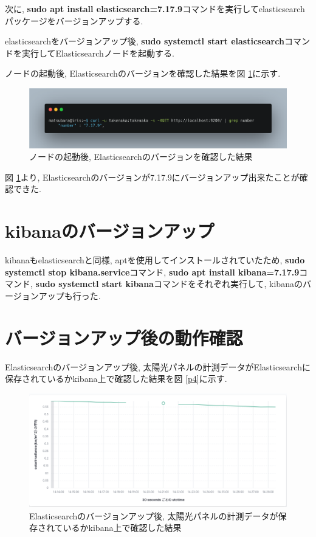 次に, \textbf{sudo apt install elasticsearch=7.17.9}コマンドを実行してelasticsearchパッケージをバージョンアップする.

elasticsearchをバージョンアップ後, \textbf{sudo systemctl start elasticsearch}コマンドを実行してElasticsearchノードを起動する.

ノードの起動後, Elasticsearchのバージョンを確認した結果を図 \ref{4-p3}に示す.

\begin{figure}[h]
  \begin{center}
    \includegraphics[width=160mm]{sotu/figure/version-check.png}
    \caption{ノードの起動後, Elasticsearchのバージョンを確認した結果}
    \label{4-p3}
  \end{center}
\end{figure}

図 \ref{4-p3}より, Elasticsearchのバージョンが7.17.9にバージョンアップ出来たことが確認できた.

\section{kibanaのバージョンアップ}

kibanaもelasticsearchと同様, aptを使用してインストールされていたため, \textbf{sudo systemctl stop kibana.service}コマンド, \textbf{sudo apt install kibana=7.17.9}コマンド, \textbf{sudo systemctl start kibana}コマンドをそれぞれ実行して, kibanaのバージョンアップも行った.

\section{バージョンアップ後の動作確認}

Elasticsearchのバージョンアップ後, 太陽光パネルの計測データがElasticsearchに保存されているかkibana上で確認した結果を図 \ref{p4}に示す.

\begin{figure}[h]
  \begin{center}
    \includegraphics[width=160mm]{sotu/figure/downtime.png}
    \caption{Elasticsearchのバージョンアップ後, 太陽光パネルの計測データが保存されているかkibana上で確認した結果}
    \label{4-p4}
  \end{center}
\end{figure}


